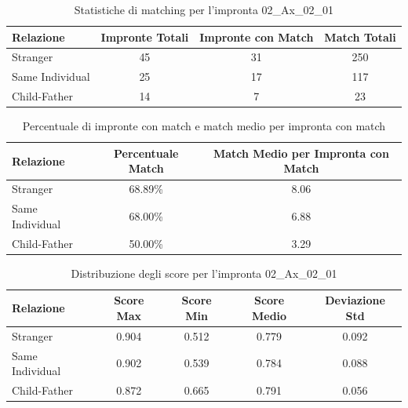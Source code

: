 \begin{table}[htbp]
\centering
\caption{Statistiche di matching per l'impronta 02\_Ax\_02\_01}
\label{tab:results_02_Ax_02_01}
\begin{tabular}{|l|c|c|c|}
\hline
\textbf{Relazione} & \textbf{Impronte Totali} & \textbf{Impronte con Match} & \textbf{Match Totali} \\
\hline
Stranger & 45 & 31 & 250 \\
\hline
Same Individual & 25 & 17 & 117 \\
\hline
Child-Father & 14 & 7 & 23 \\
\hline
\end{tabular}
\end{table}


\begin{table}[htbp]
\centering
\caption{Percentuale di impronte con match e match medio per impronta con match}
\label{tab:match_percentage_02_Ax_02_01}
\begin{tabular}{|l|c|c|}
\hline
\textbf{Relazione} & \textbf{Percentuale Match} & \textbf{Match Medio per Impronta con Match} \\
\hline
Stranger & 68.89\% & 8.06 \\
\hline
Same Individual & 68.00\% & 6.88 \\
\hline
Child-Father & 50.00\% & 3.29 \\
\hline
\end{tabular}
\end{table}


\begin{table}[htbp]
\centering
\caption{Distribuzione degli score per l'impronta 02\_Ax\_02\_01}
\label{tab:scores_02_Ax_02_01}
\begin{tabular}{|l|c|c|c|c|}
\hline
\textbf{Relazione} & \textbf{Score Max} & \textbf{Score Min} & \textbf{Score Medio} & \textbf{Deviazione Std} \\
\hline
Stranger & 0.904 & 0.512 & 0.779 & 0.092 \\
\hline
Same Individual & 0.902 & 0.539 & 0.784 & 0.088 \\
\hline
Child-Father & 0.872 & 0.665 & 0.791 & 0.056 \\
\hline
\end{tabular}
\end{table}

